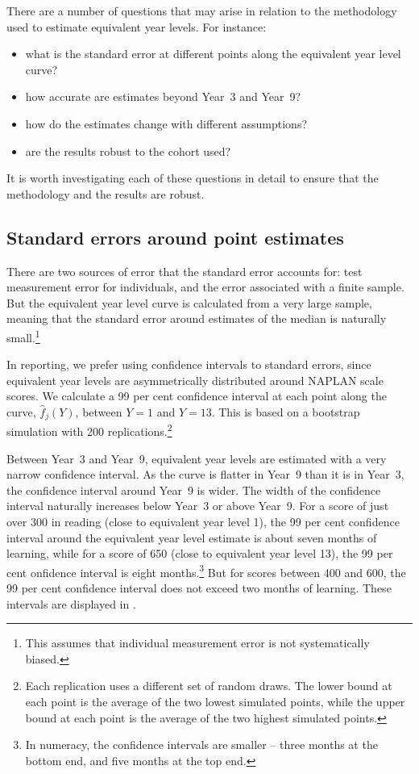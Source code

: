 There are a number of questions that may arise in relation to the methodology used to estimate equivalent year levels. For instance:
\begin{itemize}
    \item what is the standard error at different points along the equivalent year level curve?
    \item how accurate are estimates beyond \mbox{Year 3} and \mbox{Year 9}?
    \item how do the estimates change with different assumptions?
    \item are the results robust to the cohort used?
\end{itemize}

It is worth investigating each of these questions in detail to ensure that the methodology and the results are robust.

\subsection{Standard errors around point estimates} \label{sec:se_pe}

There are two sources of error that the standard error accounts for: test measurement error for individuals, and the error associated with a finite sample. But the equivalent year level curve is calculated from a very large sample, meaning that the standard error around estimates of the median is naturally small.\footnote{This assumes that individual measurement error is not systematically biased.}

In reporting, we prefer using confidence intervals to standard errors, since equivalent year levels are asymmetrically distributed around NAPLAN scale scores. We calculate a 99 per cent confidence interval at each point along the curve, $\widehat{f}_{j}(Y)$, between $Y=1$ and $Y=13$. This is based on a bootstrap simulation with 200 replications.\footnote{Each replication uses a different set of random draws. The lower bound at each point is the average of the two lowest simulated points, while the upper bound at each point is the average of the two highest simulated points.}

\newpage
Between \mbox{Year 3} and \mbox{Year 9}, equivalent year levels are estimated with a very narrow confidence interval. As the curve is flatter in \mbox{Year 9} than it is in \mbox{Year 3}, the confidence interval around \mbox{Year 9} is wider. The width of the confidence interval naturally increases below \mbox{Year 3} or above \mbox{Year 9}. For a score of just over 300 in reading (close to equivalent year level 1), the 99 per cent confidence interval around the equivalent year level estimate is about seven months of learning, while for a score of 650 (close to equivalent year level 13), the 99 per cent onfidence interval is eight months.\footnote{In numeracy, the confidence intervals are smaller -- three months at the bottom end, and five months at the top end.} But for scores between 400 and 600, the 99 per cent confidence interval does not exceed two months of learning. These intervals are displayed in  .

